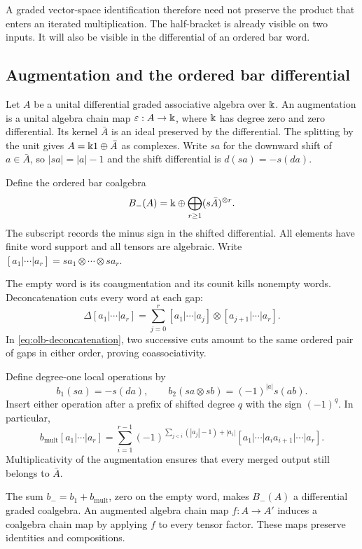 A graded vector-space identification therefore need not preserve
the product that enters an iterated multiplication.
The half-bracket is already visible on two inputs.
It will also be visible in the differential of an ordered bar word.

\subsection{Augmentation and the ordered bar differential}
\label{sec:olb-ordered-bar}

Let $A$ be a unital differential graded associative algebra over $\Bbbk$.
An augmentation is a unital algebra chain map
$\varepsilon:A\to \Bbbk$, where $\Bbbk$ has degree zero and zero differential.
Its kernel $\bar A$ is an ideal preserved by the differential.
The splitting by the unit gives $A=\Bbbk1\oplus\bar A$ as complexes.
Write $sa$ for the downward shift of $a\in\bar A$,
so $|sa|=|a|-1$ and the shift differential is $d(sa)=-s(da)$.

Define the ordered bar coalgebra
\[
 B_-(A)=\Bbbk\oplus\bigoplus_{r\geq1}(s\bar A)^{\otimes r}.
\]
The subscript records the minus sign in the shifted differential.
All elements have finite word support and all tensors are algebraic.
Write $[a_1|\cdots|a_r]=sa_1\otimes\cdots\otimes sa_r$.

The empty word is its coaugmentation and its counit kills nonempty
words.  Deconcatenation cuts every word at each gap:
\begin{equation}
 \Delta[a_1|\cdots|a_r]
 =\sum_{j=0}^r[a_1|\cdots|a_j]\otimes[a_{j+1}|\cdots|a_r].
 \label{eq:olb-deconcatenation}
\end{equation}
In \eqref{eq:olb-deconcatenation}, two successive cuts amount to
the same ordered pair of gaps in either order, proving coassociativity.

Define degree-one local operations by
\[
 b_1(sa)=-s(da),\qquad
 b_2(sa\otimes sb)=(-1)^{|a|}s(ab).
\]
Insert either operation after a prefix of shifted degree $q$ with
the sign $(-1)^q$.
In particular,
\begin{equation}
 b_{\mathrm{mult}}[a_1|\cdots|a_r]
 =\sum_{i=1}^{r-1}
 (-1)^{\sum_{j<i}(|a_j|-1)+|a_i|}
 [a_1|\cdots|a_ia_{i+1}|\cdots|a_r].
 \label{eq:olb-bar-faces}
\end{equation}
Multiplicativity of the augmentation ensures that every merged
output still belongs to $\bar A$.

\begin{proposition}\label{prop:olb-bar}
The sum $b_-=b_1+b_{\mathrm{mult}}$, zero on the empty word,
makes $B_-(A)$ a differential graded coalgebra.
An augmented algebra chain map $f:A\to A'$ induces a coalgebra
chain map by applying $f$ to every tensor factor.
These maps preserve identities and compositions.
\end{proposition}

